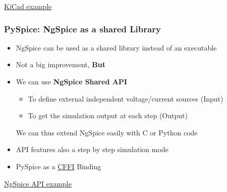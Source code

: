 \begin{frame}
\begin{columns}
\begin{column}{.4\textwidth}
\begin{center}
      \end{center}
    \end{column}
  \end{columns}
  \vspace{1em}
  \centerline{\small \href{https://pyspice.fabrice-salvaire.fr/examples/spice-parser/kicad-example.html}{KiCad example}}
\end{frame}

\begin{frame}
  \frametitle{PySpice: NgSpice as a shared Library}
  \begin{itemize}
  \item NgSpice can be used as a shared library instead of an executable
  \item Not a big improvement, \textbf{But}
  \item We can use \textbf{NgSpice Shared API}
    \begin{itemize}
    \item To define external independent voltage/current sources (Input) %
    \item To get the simulation output at each step (Output)
    \end{itemize}
    \alert{We can thus extend NgSpice easily with C or Python code}
  \item API features also a step by step simulation mode
  \item PySpice as a \href{http://cffi.readthedocs.io/en/latest/}{CFFI} Binding
  \end{itemize}
  \vspace{1em}
  \centerline{\small \href{https://pyspice.fabrice-salvaire.fr/examples/ngspice-shared/voltage-divider.html}{NgSpice API example}}
\end{frame}

